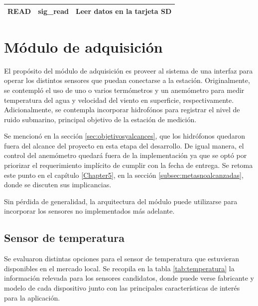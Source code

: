 \begin{table}[htpb]
{\begin{tabular}{lll}
READ                                & sig\_read                                                                                                                & Leer datos en la tarjeta SD                                                                                                                                                                                     \\
\bottomrule
\end{tabular}%
}
\end{table}

\clearpage
\section{Módulo de adquisición}
\label{sec:adquisicion}

El propósito del módulo de adquisición es proveer al sistema de una interfaz para operar los distintos sensores que puedan conectarse a la estación.  Originalmente, se contempló el uso de uno o varios termómetros y un anemómetro para medir temperatura del agua y velocidad del viento en superficie, respectivamente. Adicionalmente, se contempla incorporar hidrofónos para registrar el nivel de ruido submarino, principal objetivo de la estación de medición.

Se mencionó en la sección \ref{sec:objetivosyalcances}, que los hidrófonos quedaron fuera del alcance del proyecto en esta etapa del desarrollo.  De igual manera, el control del anemómetro quedará fuera de la implementación ya que se optó por priorizar el requerimiento implícito de cumplir con la fecha de entrega.  Se retoma este punto en el capítulo \ref{Chapter5}, en la sección \ref{subsec:metasnoalcanzadas}, donde se discuten sus implicancias.

Sin pérdida de generalidad, la arquitectura del módulo puede utilizarse para incorporar los sensores no implementados más adelante.

\subsection{Sensor de temperatura}
\label{subsec:1-wire}


Se evaluaron distintas opciones para el sensor de temperatura que estuvieran disponibles en el mercado local.  Se recopila en la tabla \ref{tab:temperatura} la información relevada para los sensores candidatos, donde puede verse fabricante y modelo de cada dispositivo junto con las principales características de interés para la aplicación.

